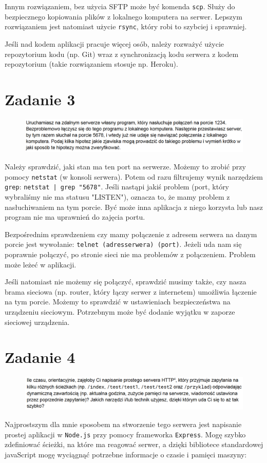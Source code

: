 \documentclass{article}
\begin{document}
		Innym rozwiązaniem, bez użycia SFTP może być komenda \texttt{scp}. Służy do bezpiecznego kopiowania plików z lokalnego komputera na serwer. Lepszym rozwiązaniem jest natomiast użycie \texttt{rsync}, który robi to szybciej i sprawniej.
		
		Jeśli nad kodem aplikacji pracuje więcej osób, należy rozważyć użycie repozytorium kodu (np. Git) wraz z synchronizacją kodu serwera z kodem repozytorium (takie rozwiązaniem stosuje np. Heroku).
		\newpage
	
	\section*{Zadanie 3}
		\begin{figure}[h!]
			\includegraphics[width=1\textwidth]{za3}
		\end{figure}
	
		Należy sprawdzić, jaki stan ma ten port na serwerze. Możemy to zrobić przy pomocy \texttt{netstat} (w konsoli serwera). Potem od razu filtrujemy wynik narzędziem \texttt{grep}:
		\texttt{netstat | grep "5678"}.
		Jeśli nastąpi jakiś problem (port, który wybraliśmy nie ma statusu "LISTEN"), oznacza to, że mamy problem z nasłuchiwaniem na tym porcie. Być może inna aplikacja z niego korzysta lub nasz program nie ma uprawnień do zajęcia portu.
		
		Bezpośrednim sprawdzeniem czy mamy połączenie z adresem serwera na danym porcie jest wywołanie:
		\texttt{telnet (adresserwera) (port)}.
		Jeżeli uda nam się poprawnie połączyć, po stronie sieci nie ma problemów z połączeniem. Problem może leżeć w aplikacji.
		
		Jeśli natomiast nie możemy się połączyć, sprawdzić musimy także, czy nasza brama sieciowa (np. router, który łączy serwer z internetem) umożliwia łączenie na tym porcie. Możemy to sprawdzić w ustawieniach bezpieczeństwa na urządzeniu sieciowym. Potrzebnym może być dodanie wyjątku w zaporze sieciowej urządzenia.
		
	\section*{Zadanie 4}
		\begin{figure}[h!]
			\includegraphics[width=1\textwidth]{za4}
		\end{figure}
		Najprostszym dla mnie sposobem na stworzenie tego serwera jest napisanie prostej aplikacji w \texttt{Node.js} przy pomocy frameworka \texttt{Express}. Mogę szybko zdefiniować ścieżki, na które ma reagować serwer, a dzięki bibliotece standardowej javaScript mogę wyciągnąć potrzebne informacje o czasie i pamięci maszyny:
		
\end{document}

